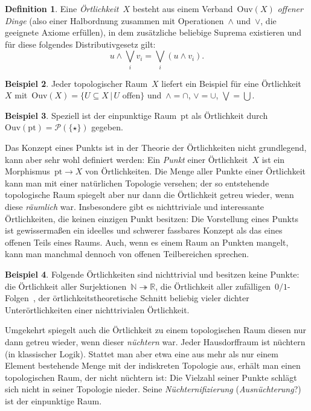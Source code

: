 \documentclass[a4paper,ngerman,12pt]{scrartcl}
\theoremstyle{definition}
\newtheorem{defn}{Definition}[section]
\newtheorem{bsp}[defn]{Beispiel}
\theoremstyle{plain}
\theoremstyle{remark}
\newcommand{\RR}{\mathbb{R}}
\newcommand{\NN}{\mathbb{N}}
\renewcommand{\P}{\mathcal{P}}
\newcommand{\Ouv}{\mathrm{Ouv}}
\newcommand{\pt}{\mathrm{pt}}
\renewcommand{\_}{\mathpunct{.}\,}
\newcommand{\?}{\,{:}\,}
\begin{document}
\begin{defn}Eine \emph{Örtlichkeit}~$X$ besteht aus einem Verband~$\Ouv(X)$
\emph{offener Dinge} (also einer Halbordnung zusammen mit Operationen~$\wedge$
und~$\vee$, die geeignete Axiome erfüllen), in dem zusätzliche beliebige
Suprema existieren und für diese folgendes Distributivgesetz gilt:
\[ u \wedge \bigvee_i v_i = \bigvee_i (u \wedge v_i). \]
\end{defn}

\begin{bsp}
Jeder topologischer Raum~$X$ liefert ein Beispiel für eine Örtlichkeit~$X$
mit~$\Ouv(X) = \{ U \subseteq X \,|\, \text{$U$ offen} \}$ und~$\wedge =
\cap$, $\vee = \cup$, $\bigvee = \bigcup$.\end{bsp}

\begin{bsp}Speziell ist der einpunktige Raum~$\pt$ als Örtlichkeit
durch~$\Ouv(\pt) = \P(\{\star\})$ gegeben.\end{bsp}

Das Konzept eines Punkts ist in der Theorie der Örtlichkeiten nicht
grundlegend, kann aber sehr wohl definiert werden: Ein \emph{Punkt} einer
Örtlichkeit~$X$ ist ein Morphismus~$\pt \to X$ von Örtlichkeiten. Die Menge
aller Punkte einer Örtlichkeit kann man mit einer natürlichen Topologie
versehen; der so entstehende topologische Raum spiegelt aber nur dann die
Örtlichkeit getreu wieder, wenn diese \emph{räumlich} war. Insbesondere gibt es
nichttriviale und interessante Örtlichkeiten, die keinen einzigen Punkt
besitzen: Die Vorstellung eines Punkts ist gewissermaßen ein ideelles und
schwerer fassbares Konzept als das eines offenen Teils eines Raums. Auch, wenn
es einem Raum an Punkten mangelt, kann man manchmal dennoch von offenen
Teilbereichen sprechen.

\begin{bsp}Folgende Örtlichkeiten sind nichttrivial und besitzen keine Punkte:
die Örtlichkeit aller Surjektionen~$\NN \twoheadrightarrow \RR$, die
Örtlichkeit aller zufälligen~$0/1$-Folgen~\cite{random}, der örtlichkeitstheoretische Schnitt
beliebig vieler dichter Unterörtlichkeiten einer nichttrivialen Örtlichkeit.\end{bsp}

Umgekehrt spiegelt auch die Örtlichkeit zu einem topologischen Raum diesen nur
dann getreu wieder, wenn dieser \emph{nüchtern} war. Jeder Hausdorffraum ist
nüchtern (in klassischer Logik).
Stattet man aber etwa eine aus mehr als nur einem Element bestehende Menge 
mit der indiskreten Topologie aus, erhält man einen
topologischen Raum, der nicht nüchtern ist: Die Vielzahl seiner Punkte schlägt
sich nicht in seiner Topologie nieder. Seine \emph{Nüchternifizierung}
(\emph{Ausnüchterung}?) ist der einpunktige Raum.
\end{document}
